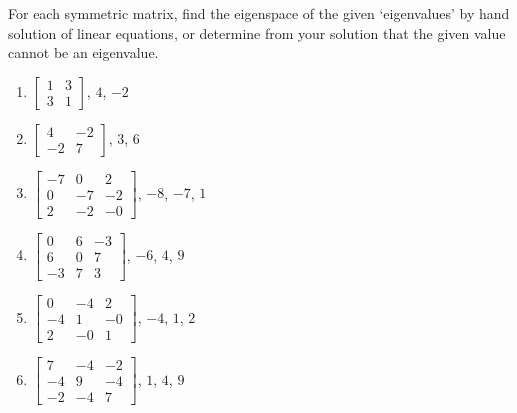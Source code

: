 \begin{example} \label{eg:}
For each symmetric matrix, find the eigenspace of the given `eigenvalues' by hand solution of linear equations, or determine from your solution that the given value cannot be an eigenvalue.
\begin{enumerate}
\item \(\begin{bmatrix} 1&3\\3&1 \end{bmatrix}\), \(4\), \(-2\)
\item \(\begin{bmatrix} 4&-2\\-2&7 \end{bmatrix}\), \(3\), \(6\)
\item \(\begin{bmatrix} -7 & 0 & 2
\\ 0 & -7 & -2
\\ 2 & -2 & -0 \end{bmatrix}\), \(-8\), \(-7\), \(1\)
\item \(\begin{bmatrix} 0 & 6 & -3
\\ 6 & 0 & 7
\\ -3 & 7 & 3 \end{bmatrix}\), \(-6\), \(4\), \(9\)
\item \(\begin{bmatrix} 0 & -4 & 2
\\ -4 & 1 & -0
\\ 2 & -0 & 1 \end{bmatrix}\), \(-4\), \(1\), \(2\)

\item \(\begin{bmatrix} 7 & -4 & -2
\\ -4 & 9 & -4
\\ -2 & -4 & 7 \end{bmatrix}\), \(1\), \(4\), \(9\)
\end{enumerate}
\end{example}



